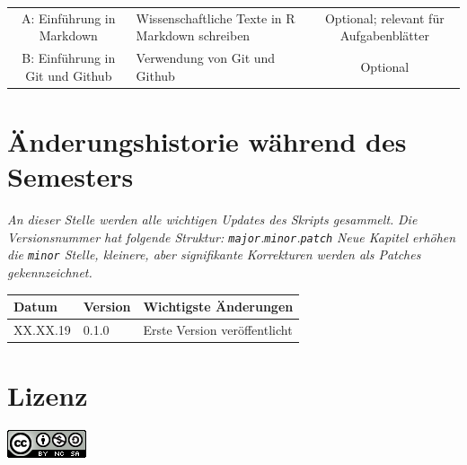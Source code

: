 \documentclass[]{tufte-book}
\begin{document}
\begin{longtable}[]{@{}clc@{}}
\begin{minipage}[t]{0.24\columnwidth}
A: Einführung in Markdown\strut
\end{minipage} & \begin{minipage}[t]{0.34\columnwidth}\raggedright\strut
Wissenschaftliche Texte in R Markdown schreiben\strut
\end{minipage} & \begin{minipage}[t]{0.34\columnwidth}\centering\strut
Optional; relevant für Aufgabenblätter\strut
\end{minipage}\tabularnewline
\begin{minipage}[t]{0.24\columnwidth}\centering\strut
B: Einführung in Git und Github\strut
\end{minipage} & \begin{minipage}[t]{0.34\columnwidth}\raggedright\strut
Verwendung von Git und Github\strut
\end{minipage} & \begin{minipage}[t]{0.34\columnwidth}\centering\strut
Optional\strut
\end{minipage}\tabularnewline
\bottomrule
\end{longtable}

\section*{Änderungshistorie während des
Semesters}\label{anderungshistorie-wahrend-des-semesters}

\emph{An dieser Stelle werden alle wichtigen Updates des Skripts
gesammelt.} \emph{Die Versionsnummer hat folgende Struktur:
\texttt{major}.\texttt{minor}.\texttt{patch}} \emph{Neue Kapitel erhöhen
die \texttt{minor} Stelle, kleinere, aber signifikante}
\emph{Korrekturen werden als Patches gekennzeichnet.}

\begin{longtable}[]{@{}lll@{}}
\toprule
Datum & Version & Wichtigste Änderungen\tabularnewline
\midrule
\endhead
XX.XX.19 & 0.1.0 & Erste Version veröffentlicht\tabularnewline
\bottomrule
\end{longtable}

\section*{Lizenz}\label{lizenz}

\begin{center}\includegraphics[width=0.2\linewidth]{figures/license} \end{center}
\end{document}
